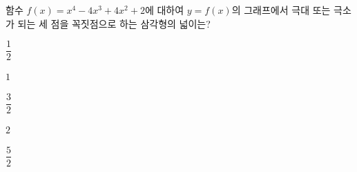 함수 $f(x)=x^4-4x^3+4x^2+2$에 대하여 $y=f(x)$의 그래프에서 극대 또는 극소가 되는 세 점을 꼭짓점으로 하는 삼각형의 넓이는?
\begin{choices32}{\rule[-3ex]{0pt}{8ex}$\dfrac{1}{2}$}{\rule[-3ex]{0pt}{8ex}$1$}{\rule[-3ex]{0pt}{8ex}$\dfrac{3}{2}$}{\rule[-3ex]{0pt}{8ex}$2$}{\rule[-3ex]{0pt}{8ex}$\dfrac{5}{2}$}\end{choices32}
